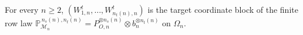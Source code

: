 For every \(n\ge2\), \((W^t_{1,n},\ldots,W^t_{n_t(n),n})\) is the target coordinate block of the finite row law \(\mathbb P_{\mathcal M_n}^{\,n_s(n),n_t(n)}=P_{O,n}^{\otimes n_s(n)}\otimes b_n^{\otimes n_t(n)}\) on \(\Omega_n\).